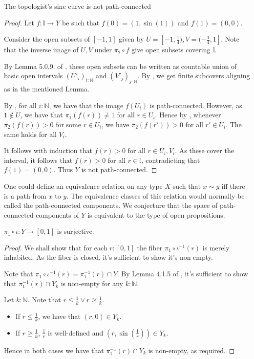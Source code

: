 \documentclass{../util/zariski}
\begin{document}
\begin{theorem}
  The topologist's sine curve is not path-connected
\end{theorem}
\begin{proof}
  Let $f:\mathbb I \to Y$ be such that 
  $f(0) = (1,\sin(1))$ and 
  $f(1) = (0,0)$. 
  
  Consider the open subsets of $[-1,1]$ given by 
  $U = [-1, \frac14), V = (-\frac14, 1]$. 
  Note that the inverse image of $U,V$ under $\pi_2 \circ f$ give open subsets covering $\mathbb I$.
  
  By Lemma 5.0.9. of \cite{synthetic-stone-duality}, these open subsets 
  can be written as countable union of basic open intervals 
  $(U'_i)_{i:\mathbb N}$ and $(V'_j)_{j:\mathbb N}$. 
  By , we get finite subcovers aligning as in the mentioned Lemma. 

  By , for all $i:\mathbb N$, 
  we have that the image $f(U_i)$ is path-connected. 
  However, as $1\notin U$, we have that $\pi_1(f(r))\neq 1$ for all $r\in U_i$. 
  Hence by , 
  whenever $\pi_2(f(r))>0$ for some $r\in U_i$, we have $\pi_2(f(r'))>0$ for all $r'\in U_i$. 
  The same holds for all $V_i$. 

  It follows with induction that $f(r)>0$ for all $r\in U_i, V_i$.
  As these cover the interval, it follows that $f(r) >0$ for all $r\in \mathbb I$, 
  contradicting that $f(1) = (0,0)$. 
  Thus $Y$ is not path-connected. 
\end{proof}
\begin{remark}
  One could define an equivalence relation on any type $X$ such that 
  $x\sim y$ iff there is a path from $x$ to $y$. 
  The equivalence classes of this relation would normally be called the path-connected components. 
  We conjecture that the space of path-connected components of $Y$ is equivalent to the type of open propositions. 
\end{remark}

\begin{lemma}
  $\pi_1\circ \iota : Y \to [0,1]$ is surjective.  
\end{lemma}
\begin{proof}
  We shall show that for each $r:[0,1]$ the fiber $\pi_1\circ \iota^{-1}(r)$ is merely inhabited. 
  As the fiber is closed, it's sufficient to show it's non-empty. 

  Note that $\pi_1\circ \iota^{-1}(r)= \pi_1^{-1}(r) \cap Y$. 
  By Lemma 4.1.5 of \cite{synthetic-stone-duality}, 
  it's sufficient to show that $\pi_1^{-1}(r) \cap Y_k$ 
  is non-empty for any $k:\mathbb N$. 

  Let $k:\mathbb N$. 
  Note that $r\leq \frac1k \vee r \geq \frac 1k$. 
  \begin{itemize}
    \item If $r\leq \frac1k$, we have that $(r,0) \in Y_k$. 
    \item If $r\geq \frac1k$, $\frac1r$ is well-defined and 
      $(r,\sin(\frac1r)) \in Y_k$. 
  \end{itemize}
  Hence in both cases we have that $\pi_1^{-1}(r) \cap Y_k$ is non-empty, as required. 
\end{proof}
\end{document}
